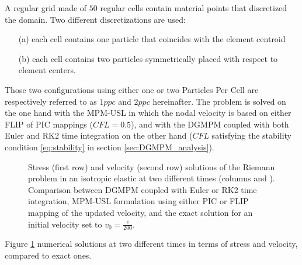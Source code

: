 A regular grid made of $50$ regular cells contain material points that discretized the domain. Two different discretizations are used:
\begin{itemize}
\item[(a)] each cell contains one particle that coincides with the element centroid
\item[(b)] each cell contains two particles symmetrically placed with respect to element centers.
\end{itemize}
Those two configurations using either one or two Particles Per Cell are respectively referred to as $1ppc$ and $2ppc$ hereinafter.
The problem is solved on the one hand with the MPM-USL in which the nodal velocity is based on either FLIP of PIC mappings ($CFL=0.5$), and with the DGMPM coupled with both Euler and RK2 time integration on the other hand ($CFL$ satisfying the stability condition \eqref{eq:stability} in section \ref{sec:DGMPM_analysis}).
\begin{figure}[h!]
  \centering
  { \label{subfig:rp_elastic1}}
  { \label{subfig:rp_elastic2}}
  
  \caption{Stress (first row) and velocity (second row) solutions of the Riemann problem in an isotropic elastic at two different times (columns  and ). Comparison between DGMPM coupled with Euler or RK2 time integration, MPM-USL formulation using either PIC or FLIP mapping of the updated velocity, and the exact solution for an initial velocity set to $v_0=\frac{c}{200}$.}
  \label{fig:elastic_stress}
\end{figure}
Figure \ref{fig:elastic_stress} numerical solutions at two different times in terms of stress and velocity, compared to exact ones. 
